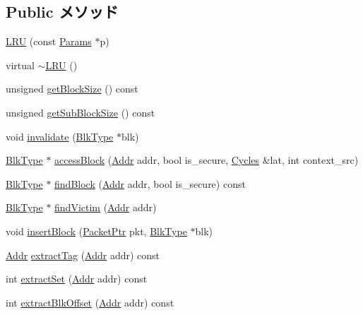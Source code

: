 \subsection*{Public メソッド}
\begin{DoxyCompactItemize}
\item 
\hyperlink{classLRU_ad9acf3c29ee59e97dd4b0b73d560f382}{LRU} (const \hyperlink{classLRU_a7817e729934956b9b3573d13924bf1eb}{Params} $\ast$p)
\item 
virtual \hyperlink{classLRU_a611da3810a76e96c8b574845d82b6b8c}{$\sim$LRU} ()
\item 
unsigned \hyperlink{classLRU_a38301abe4b3689f8ac7de5c13a046234}{getBlockSize} () const 
\item 
unsigned \hyperlink{classLRU_aca3769c95ef908ce22475a69f8929a32}{getSubBlockSize} () const 
\item 
void \hyperlink{classLRU_a11ea27715371eaeb125996e0a9ce14ab}{invalidate} (\hyperlink{classCacheBlk}{BlkType} $\ast$blk)
\item 
\hyperlink{classCacheBlk}{BlkType} $\ast$ \hyperlink{classLRU_a969b41d68459011b652da68b4d5683a9}{accessBlock} (\hyperlink{base_2types_8hh_af1bb03d6a4ee096394a6749f0a169232}{Addr} addr, bool is\_\-secure, \hyperlink{classCycles}{Cycles} \&lat, int context\_\-src)
\item 
\hyperlink{classCacheBlk}{BlkType} $\ast$ \hyperlink{classLRU_a0db6e9d80746c5480efcbba5d6be30da}{findBlock} (\hyperlink{base_2types_8hh_af1bb03d6a4ee096394a6749f0a169232}{Addr} addr, bool is\_\-secure) const 
\item 
\hyperlink{classCacheBlk}{BlkType} $\ast$ \hyperlink{classLRU_ac69a78bca11156aff8773ad59125b55b}{findVictim} (\hyperlink{base_2types_8hh_af1bb03d6a4ee096394a6749f0a169232}{Addr} addr)
\item 
void \hyperlink{classLRU_a79eef32acfa26685ba4a2f8e89f3f949}{insertBlock} (\hyperlink{classPacket}{PacketPtr} pkt, \hyperlink{classCacheBlk}{BlkType} $\ast$blk)
\item 
\hyperlink{base_2types_8hh_af1bb03d6a4ee096394a6749f0a169232}{Addr} \hyperlink{classLRU_a3a855eb5b0d8adbf737f25baa15a3d7b}{extractTag} (\hyperlink{base_2types_8hh_af1bb03d6a4ee096394a6749f0a169232}{Addr} addr) const 
\item 
int \hyperlink{classLRU_a8fdcc1372cb0a5d8e1933bdb0bf7d680}{extractSet} (\hyperlink{base_2types_8hh_af1bb03d6a4ee096394a6749f0a169232}{Addr} addr) const 
\item 
int \hyperlink{classLRU_aca82d98193a0685a9648acf6127abb1c}{extractBlkOffset} (\hyperlink{base_2types_8hh_af1bb03d6a4ee096394a6749f0a169232}{Addr} addr) const 

\end{DoxyCompactItemize}
